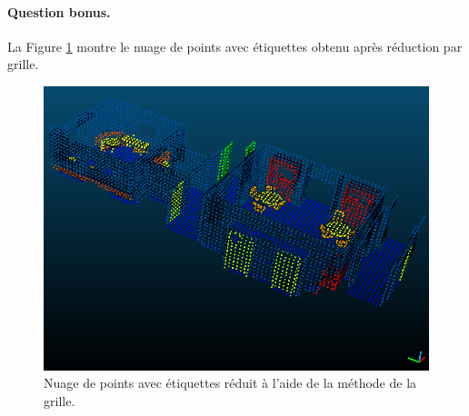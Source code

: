 \documentclass[french]{article}
\begin{document}
\paragraph{Question bonus.}
La Figure \ref{fig:qbonus} montre le nuage de points avec étiquettes obtenu après réduction par grille.

\begin{figure}[h]
	\centering
	\includegraphics[width=0.6\linewidth]{qb1.png}
	\caption{Nuage de points avec étiquettes réduit à l'aide de la méthode de la grille.}
	\label{fig:qbonus}
\end{figure}
\end{document}
